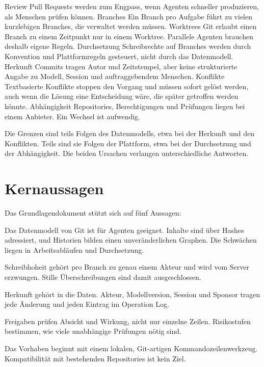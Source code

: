 \starttable[|lw(3.5cm)|lw(10.5cm)|]
\HL
{}  \NC \NR
\HL
\NC Review \NC Pull Requests werden zum Engpass, wenn Agenten schneller produzieren, als Menschen prüfen können. \NC \NR
\NC Branches \NC Ein Branch pro Aufgabe führt zu vielen kurzlebigen Branches, die verwaltet werden müssen. \NC \NR
\NC Worktrees \NC Git erlaubt einen Branch zu einem Zeitpunkt nur in einem Worktree. Parallele Agenten brauchen deshalb eigene Regeln. \NC \NR
\NC Durchsetzung \NC Schreibrechte auf Branches werden durch Konvention und Plattformregeln gesteuert, nicht durch das Datenmodell. \NC \NR
\NC Herkunft \NC Commits tragen Autor und Zeitstempel, aber keine strukturierte Angabe zu Modell, Session und auftraggebendem Menschen. \NC \NR
\NC Konflikte \NC Textbasierte Konflikte stoppen den Vorgang und müssen sofort gelöst werden, auch wenn die Lösung eine Entscheidung wäre, die später getroffen werden könnte. \NC \NR
\NC Abhängigkeit \NC Repositories, Berechtigungen und Prüfungen liegen bei einem Anbieter. Ein Wechsel ist aufwendig. \NC \NR
\HL
\stoptable

Die Grenzen sind teils Folgen des Datenmodells, etwa bei der Herkunft und den Konflikten. Teils sind sie Folgen der Plattform, etwa bei der Durchsetzung und der Abhängigkeit. Die beiden Ursachen verlangen unterschiedliche Antworten.

\section{Kernaussagen}

Das Grundlagendokument stützt sich auf fünf Aussagen:

\startitemize[n]
\item Das Datenmodell von Git ist für Agenten geeignet. Inhalte sind über Hashes adressiert, und Historien bilden einen unveränderlichen Graphen. Die Schwächen liegen in Arbeitsabläufen und Durchsetzung.
\item Schreibhoheit gehört pro Branch zu genau einem Akteur und wird vom Server erzwungen. Stille Überschreibungen sind damit ausgeschlossen.
\item Herkunft gehört in die Daten. Akteur, Modellversion, Session und Sponsor tragen jede Änderung und jeden Eintrag im Operation Log.
\item Freigaben prüfen Absicht und Wirkung, nicht nur einzelne Zeilen. Risikostufen bestimmen, wie viele unabhängige Prüfungen nötig sind.
\item Das Vorhaben beginnt mit einem lokalen, Git-artigen Kommandozeilenwerkzeug. Kompatibilität mit bestehenden Repositories ist kein Ziel.
\stopitemize

